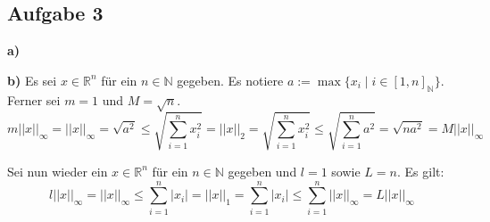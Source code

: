 \documentclass[a4paper,graphics,11pt]{article}
\newcommand{\aufgabe}[1]{\subsection*{Aufgabe #1}}
\begin{document}
\aufgabe{3}
\textbf{a)}
\strut\vspace
\strut\vspace
\strut\vspace
\strut\vspace
\strut\vspace
\strut\vspace
\strut\vspace
\strut\vspace
\strut\vspace
\strut\vspace
\strut\vspace
\strut\vspace
\strut\vspace
\strut\vspace

\textbf{b)}
Es sei $x \in \mathbb{R}^n$ für ein $n \in \mathbb{N}$ gegeben. Es notiere $a:= \max \{x_i \mid i \in [1,n]_\mathbb{N} \}$. Ferner sei $m = 1$ und $M = \sqrt{n}$.
$$
	m||x||_\infty
	= ||x||_\infty
	= \sqrt{a^2}
	\leq \sqrt{\sum_{i=1}^{n} x_i^2}
	= ||x||_2
	= \sqrt{\sum_{i=1}^{n} x_i^2}
	\leq \sqrt{\sum_{i=1}^{n} a^2}
	= \sqrt{na^2}
	= M||x||_\infty
$$

Sei nun wieder ein $x \in \mathbb{R}^n$ für ein $n \in \mathbb{N}$ gegeben und $l = 1$ sowie $L = n$. Es gilt:
$$
	l||x||_\infty
	= ||x||_\infty
	\leq \sum_{i=1}^{n} |x_i|
	= ||x||_1
	= \sum_{i=1}^{n} |x_i|
	\leq \sum_{i=1}^{n} ||x||_\infty
	= L||x||_\infty
$$
\end{document}
